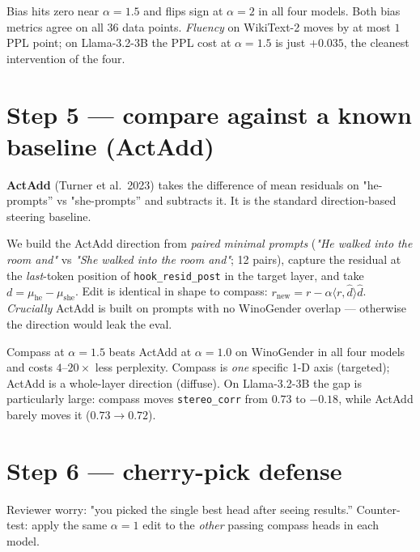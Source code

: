 \documentclass[11pt]{article}
\begin{document}
\begin{tcolorbox}[findbox]
Bias hits zero near $\alpha{=}1.5$ and flips sign at $\alpha{=}2$ in
all four models. Both bias metrics agree on all 36 data points.
\emph{Fluency} on WikiText-2 moves by at most $1$ PPL point; on
Llama-3.2-3B the PPL cost at $\alpha{=}1.5$ is just $+0.035$, the
cleanest intervention of the four.
\end{tcolorbox}

\section{Step 5 --- compare against a known baseline (ActAdd)}
\textbf{ActAdd} (Turner et al.\ 2023) takes the difference of mean
residuals on "he-prompts'' vs "she-prompts'' and subtracts it. It is
the standard direction-based steering baseline.

\begin{tcolorbox}[techbox, title=Technical: ActAdd direction]
We build the ActAdd direction from \emph{paired minimal prompts}
(\emph{"He walked into the room and"} vs \emph{"She walked into the
room and"}; 12 pairs), capture the residual at the \emph{last}-token
position of \texttt{hook\_resid\_post} in the target layer, and take
$d = \mu_\text{he} - \mu_\text{she}$. Edit is identical in shape to
compass:
$r_\text{new} = r - \alpha \langle r, \hat d\rangle \hat d$.
\emph{Crucially} ActAdd is built on prompts with no WinoGender
overlap --- otherwise the direction would leak the eval.
\end{tcolorbox}

\begin{tcolorbox}[findbox]
Compass at $\alpha{=}1.5$ beats ActAdd at $\alpha{=}1.0$ on WinoGender
in all four models and costs $4$--$20\times$ less perplexity.
Compass is \emph{one} specific 1-D axis (targeted); ActAdd is a
whole-layer direction (diffuse). On Llama-3.2-3B the gap is
particularly large: compass moves \texttt{stereo\_corr} from $0.73$ to
$-0.18$, while ActAdd barely moves it ($0.73 \to 0.72$).
\end{tcolorbox}

\section{Step 6 --- cherry-pick defense}
Reviewer worry: "you picked the single best head after seeing results.''
Counter-test: apply the same $\alpha{=}1$ edit to the \emph{other}
passing compass heads in each model.
\end{document}
